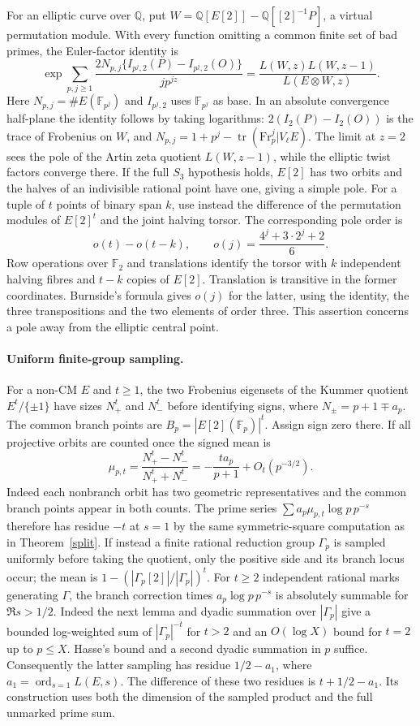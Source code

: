 \documentclass[11pt]{article}
\newcommand{\Q}{\mathbb Q}\newcommand{\Z}{\mathbb Z}\newcommand{\F}{\mathbb F}
\newcommand{\ord}{\operatorname{ord}}\newcommand{\Sur}{\operatorname{Sur}}
\begin{document}
For an elliptic curve over $\Q$, put $W=\Q[E[2]]-\Q[[2]^{-1}P]$, a virtual permutation module. With every function omitting a common finite set of bad primes, the Euler-factor identity is
\[
 \exp\!\sum_{p,j\ge1}
 \frac{2N_{p,j}\{I_{p^j,2}(P)-I_{p^j,2}(O)\}}{j p^{jz}}
 =\frac{L(W,z)L(W,z-1)}{L(E\otimes W,z)}.
\]
Here $N_{p,j}=\#E(\F_{p^j})$ and $I_{p^j,2}$ uses $\F_{p^j}$ as base. In an absolute convergence half-plane the identity follows by taking logarithms: $2(I_2(P)-I_2(O))$ is the trace of Frobenius on $W$, and $N_{p,j}=1+p^j-\operatorname{tr}(\mathrm{Fr}_p^j|V_\ell E)$. The limit at $z=2$ sees the pole of the Artin zeta quotient $L(W,z-1)$, while the elliptic twist factors converge there. If the full $S_3$ hypothesis holds, $E[2]$ has two orbits and the halves of an indivisible rational point have one, giving a simple pole. For a tuple of $t$ points of binary span $k$, use instead the difference of the permutation modules of $E[2]^t$ and the joint halving torsor. The corresponding pole order is
\[
 o(t)-o(t-k),\qquad o(j)=\frac{4^j+3\cdot 2^j+2}{6}.
\]
Row operations over $\F_2$ and translations identify the torsor with $k$ independent halving fibres and $t-k$ copies of $E[2]$. Translation is transitive in the former coordinates. Burnside's formula gives $o(j)$ for the latter, using the identity, the three transpositions and the two elements of order three. This assertion concerns a pole away from the elliptic central point.

\paragraph{Uniform finite-group sampling.}
For a non-CM $E$ and $t\ge1$, the two Frobenius eigensets of the Kummer quotient $E^t/\{\pm1\}$ have sizes $N_+^t$ and $N_-^t$ before identifying signs, where $N_\pm=p+1\mp a_p$. The common branch points are $B_p=|E[2](\F_p)|^t$. Assign sign zero there. If all projective orbits are counted once the signed mean is
\[
 \mu_{p,t}=\frac{N_+^t-N_-^t}{N_+^t+N_-^t}
 =-\frac{t a_p}{p+1}+O_t(p^{-3/2}).
\]
Indeed each nonbranch orbit has two geometric representatives and the common branch points appear in both counts. The prime series $\sum a_p\mu_{p,t}\log p\,p^{-s}$ therefore has residue $-t$ at $s=1$ by the same symmetric-square computation as in Theorem~\ref{split}. If instead a finite rational reduction group $\Gamma_p$ is sampled uniformly before taking the quotient, only the positive side and its branch locus occur; the mean is $1-(|\Gamma_p[2]|/|\Gamma_p|)^t$. For $t\ge2$ independent rational marks generating $\Gamma$, the branch correction times $a_p\log p\,p^{-s}$ is absolutely summable for $\Re s>1/2$. Indeed the next lemma and dyadic summation over $|\Gamma_p|$ give a bounded log-weighted sum of $|\Gamma_p|^{-t}$ for $t>2$ and an $O(\log X)$ bound for $t=2$ up to $p\le X$. Hasse's bound and a second dyadic summation in $p$ suffice. Consequently the latter sampling has residue $1/2-a_1$, where $a_1=\ord_{s=1}L(E,s)$. The difference of these two residues is $t+1/2-a_1$. Its construction uses both the dimension of the sampled product and the full unmarked prime sum.
\end{document}
